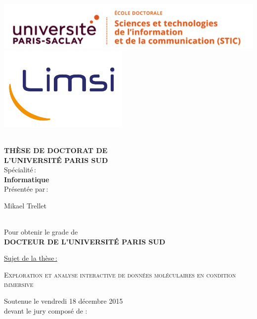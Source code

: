 \begin{titlepage}

\includegraphics[height=2.cm]{./figures/logo_paris_saclay_stic}\hfill
\includegraphics[height=2.cm]{./figures/limsilogo_new_transparent_crop}\hfill
\\
\\



\begin{center}
 \textbf{THÈSE DE DOCTORAT DE\\ L'UNIVERSITÉ PARIS SUD\\}
Spécialité\,:\\
\textbf{Informatique}\\ 
Présentée par\,:\\ 
\begin{LARGE}
Mikael Trellet\end{LARGE}\\
Pour obtenir le grade de\\
\textbf{DOCTEUR DE L'UNIVERSITÉ PARIS SUD}
\end{center}

\noindent \underline{Sujet de la thèse\,:}\\
\begin{center}
\begin{Large}
{\textsc{Exploration et analyse interactive de données moléculaires en condition immersive}}
\end{Large}
\end{center}

Soutenue le vendredi 18 décembre 2015\\

devant le jury composé de :\\
\begin{center}
	\begin{tabular}{l l l}
	

\end{tabular}
\end{center}
\end{titlepage}
